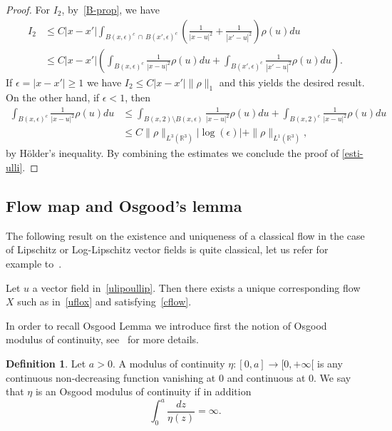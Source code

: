 \documentclass[10pt]{amsart}
\theoremstyle{definition}\newtheorem{defi}[theo]{Definition}\newtheorem{rema}[theo]{Remark}\newtheorem{exam}[theo]{Example}\newtheorem{exem}[theo]{Example}\newtheorem{nota}[theo]{Notation}
\newcommand{\R}{\mathbb{R}}
\renewcommand{\leq}{\leqslant}
\renewcommand{\geq}{\geqslant}
\begin{document}
\begin{proof}
For $I_2$, by~\eqref{B-prop}, we have
\begin{align*}
I_2 &\leq C |x-x'| \int_{B(x,\epsilon)^c\,\cap\,B(x',\epsilon)^c} \left(\frac{1}{|x-u|^2}+\frac{1}{|x'-u|^2} \right)\rho(u) du\\
&\leq C |x-x'|\left(\int_{B(x,\epsilon)^c} \frac{1}{|x-u|^2} \rho(u) du+ \int_{B(x',\epsilon)^c} \frac{1}{|x'-u|^2} \rho(u) du\right).
\end{align*}
If $\epsilon=|x-x'|\geq 1$ we have $I_2\leq C |x-x'|\| \rho\|_1$ and this yields the desired result. On the other hand, if $\epsilon<1$, then
\begin{align*}
\int_{B(x,\epsilon)^c} \frac{1}{|x-u|^2} \rho(u) du &\leq \int_{B(x,2)\setminus B(x,\epsilon)} \frac{1}{|x-u|^2} \rho(u) du + \int_{B(x,2)^c} \frac{1}{|x-u|^2} \rho(u) du\\
&\leq C\|\rho\|_{L^3 \left(\R^3\right)} | \log(\epsilon)|+ \|\rho\|_{L^1 \left(\R^3\right)},
\end{align*}
by H\"older's inequality. By combining the estimates we conclude the proof of \eqref{esti-ulli}.
\end{proof}



\subsection{Flow map and Osgood's lemma}

The following result on the existence and uniqueness of a classical flow in the case of Lipschitz or Log-Lipschitz vector fields is quite classical, let us refer for example to~\cite{BCD}.

\begin{prop}\label{prop_flow}
Let $u$ a vector field in~\eqref{ulipoullip}. Then there exists a unique corresponding flow $X$ such as in~\eqref{uflox} and satisfying~\eqref{cflow}.
\end{prop}

In order to recall Osgood Lemma we introduce first the notion of Osgood modulus of continuity, see~\cite[Definition~3.1]{BCD} for more details.

\begin{defi}
Let $a>0$. A modulus of continuity $ \eta: [0,a] \to [0,+\infty[$ is any continuous non-decreasing function vanishing at $0$ and continuous at $0$. We say that $\eta$ is an Osgood modulus of continuity if in addition
\[
\int_0^a \frac{dz}{\eta(z)} = \infty.
\]
\end{defi}
\end{document}
